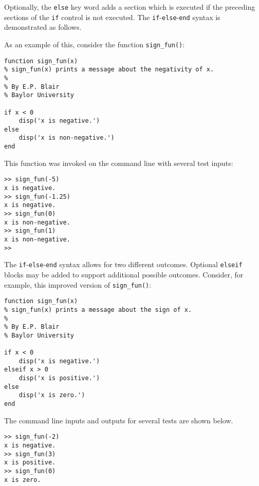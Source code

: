Optionally, the \texttt{else} key word adds a section which is executed if the preceding sections of the \texttt{if} control is not executed. The \texttt{if}-\texttt{else}-\texttt{end} syntax is demonstrated as follows.

As an example of this, consider the function \verb!sign_fun()!:
\begin{lstlisting}[style=Matlab-editor]
function sign_fun(x)
% sign_fun(x) prints a message about the negativity of x.
%
% By E.P. Blair
% Baylor University

if x < 0
    disp('x is negative.')
else
    disp('x is non-negative.')
end
\end{lstlisting}
This function was invoked on the command line with several test inputs:
\begin{lstlisting}[style=Matlab-editor]
>> sign_fun(-5)
x is negative.
>> sign_fun(-1.25)
x is negative.
>> sign_fun(0)
x is non-negative.
>> sign_fun(1)
x is non-negative.
>> 
\end{lstlisting}

The \texttt{if}-\texttt{else}-\texttt{end} syntax allows for two different outcomes. Optional \texttt{elseif} blocks may be added to support additional possible outcomes. Consider, for example, this improved version of \verb!sign_fun()!:
\begin{lstlisting}[style=Matlab-editor]
function sign_fun(x)
% sign_fun(x) prints a message about the sign of x.
%
% By E.P. Blair
% Baylor University

if x < 0
    disp('x is negative.')
elseif x > 0
    disp('x is positive.')
else
    disp('x is zero.')
end
\end{lstlisting}
The command line inputs and outputs for several tests are shown below.
\begin{lstlisting}[style=Matlab-editor]
>> sign_fun(-2)
x is negative.
>> sign_fun(3)
x is positive.
>> sign_fun(0)
x is zero.
\end{lstlisting}

